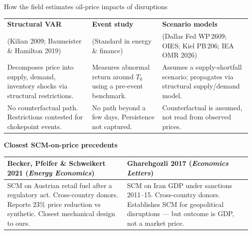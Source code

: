 \documentclass[aspectratio=169,11pt]{beamer}
\newcommand{\src}[1]{{\footnotesize\textcolor{muted}{(#1)}}}
\newcommand{\hd}[1]{\textbf{#1}}
\begin{document}
\begin{frame}{How the field estimates oil-price impacts of disruptions}
  \scriptsize
  \vspace{0.1em}

  \begin{tabular}{@{}p{} p{} p{}@{}}
    \toprule
    \hd{Structural VAR} & \hd{Event study} & \hd{Scenario models} \\
    \src{Kilian 2009; Baumeister \& Hamilton 2019} &
    \src{Standard in energy \& finance} &
    \src{Dallas Fed WP\,2609; OIES; Kiel PB\,206; IEA OMR 2026} \\
    \midrule
    Decomposes price into supply, demand, inventory shocks via structural restrictions. &
    Measures abnormal return around $T_0$ using a pre-event benchmark. &
    Assumes a supply-shortfall scenario; propagates via structural supply/demand model. \\[0.3em]
    \textcolor{muted}{No counterfactual path. Restrictions contested for chokepoint events.} &
    \textcolor{muted}{No path beyond a few days. Persistence not captured.} &
    \textcolor{muted}{Counterfactual is assumed, not read from observed prices.} \\
    \bottomrule
  \end{tabular}

  \vspace{0.35em}
  \hd{Closest SCM-on-price precedents}
  \vspace{0.15em}

  \begin{tabular}{@{}p{} p{}@{}}
    \toprule
    \hd{Becker, Pfeifer \& Schweikert 2021} \src{\textit{Energy Economics}} &
    \hd{Gharehgozli 2017} \src{\textit{Economics Letters}} \\
    \midrule
    SCM on Austrian retail fuel after a regulatory act.
    Cross-country donors. Reports 23\% price reduction vs synthetic.
    Closest mechanical design to ours. &
    SCM on Iran GDP under sanctions 2011--15.
    Cross-country donors. Establishes SCM for geopolitical disruptions
    --- but outcome is GDP, not a market price. \\
    \bottomrule
  \end{tabular}

  \vspace{0.35em}
  \begin{center}
  \end{center}


\end{frame}
\end{document}
